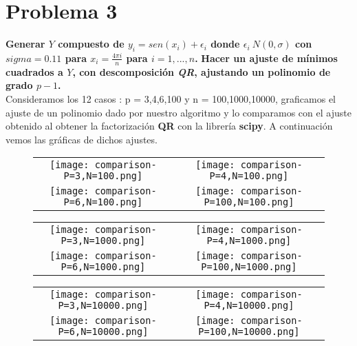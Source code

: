 \documentclass[12pt,letterpaper]{article}
\begin{document}
\section*{Problema 3}

\textbf{Generar $Y$ compuesto de $y_i = sen(x_i) + \epsilon_i$ donde $\epsilon_i ~ N(0,\sigma)$ con $sigma = 0.11$ para $x_i = \frac{4 \pi i}{n}$ para $i=1,...,n$.} \textbf{Hacer un ajuste de m\'inimos cuadrados a $Y$, con descomposici\'on \textit{QR}, ajustando un polinomio de grado $p - 1$.} \\

Consideramos los 12 casos : p = 3,4,6,100 y n = 100,1000,10000, graficamos el ajuste de un polinomio dado por nuestro algoritmo y lo comparamos con el ajuste obtenido al obtener la factorizaci\'on \textbf{QR} con la librer\'ia \textbf{scipy}. A continuaci\'on vemos las gr\'aficas de dichos ajustes.


\begin{figure}
\begin{tabular}{cc}
  \texttt{[image: comparison-P=3,N=100.png]} &   \texttt{[image: comparison-P=4,N=100.png]} \\
  \texttt{[image: comparison-P=6,N=100.png]} &   \texttt{[image: comparison-P=100,N=100.png]} \\
\end{tabular}
\end{figure}

\begin{figure}
\begin{tabular}{cc}
  \texttt{[image: comparison-P=3,N=1000.png]} &   \texttt{[image: comparison-P=4,N=1000.png]} \\
  \texttt{[image: comparison-P=6,N=1000.png]} &   \texttt{[image: comparison-P=100,N=1000.png]} \\
\end{tabular}
\end{figure}

\begin{figure}
\begin{tabular}{cc}
  \texttt{[image: comparison-P=3,N=10000.png]} &   \texttt{[image: comparison-P=4,N=10000.png]} \\
  \texttt{[image: comparison-P=6,N=10000.png]} &   \texttt{[image: comparison-P=100,N=10000.png]} \\
\end{tabular}
\end{figure}
\end{document}
